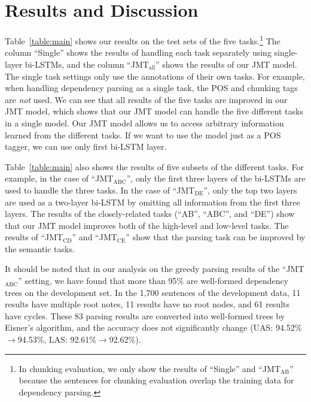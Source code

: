 \documentclass[11pt,a4paper]{article}
\begin{document}
\section{Results and Discussion}

Table~\ref{table:main} shows our results on the test sets of the five tasks.\footnote{In chunking evaluation, we only show the results of ``Single'' and ``JMT$_{\mathrm{AB}}$'' because the sentences for chunking evaluation overlap the training data for dependency parsing.}
The column ``Single'' shows the results of handling each task separately using single-layer bi-LSTMs, and the column ``JMT$_{\mathrm{all}}$'' shows the results of our JMT model.
The single task settings only use the annotations of their own tasks.
For example, when handling dependency parsing as a single task, the POS and chunking tags are {\it not} used.
We can see that all results of the five tasks are improved in our JMT model, which shows that our JMT model can handle the five different tasks in a single model.
Our JMT model allows us to access arbitrary information learned from the different tasks.
If we want to use the model just as a POS tagger, we can use only first bi-LSTM layer.

Table~\ref{table:main} also shows the results of five subsets of the different tasks.
For example, in the case of ``JMT$_{\mathrm{ABC}}$'', only the first three layers of the bi-LSTMs are used to handle the three tasks.
In the case of ``JMT$_{\mathrm{DE}}$'', only the top two layers are used as a two-layer bi-LSTM by omitting all information from the first three layers.
The results of the closely-related tasks (``AB'', ``ABC'', and ``DE'') show that our JMT model improves both of the high-level and low-level tasks.
The results of ``JMT$_{\mathrm{CD}}$'' and ``JMT$_{\mathrm{CE}}$'' show that the parsing task can be improved by the semantic tasks.

It should be noted that in our analysis on the greedy parsing results of the ``JMT$_{\mathrm{ABC}}$'' setting, we have found that more than 95\% are well-formed dependency trees on the development set.
In the 1,700 sentences of the development data, 11 results have multiple root notes, 11 results have no root nodes, and 61 results have cycles.
These 83 parsing results are converted into well-formed trees by Eisner's algorithm, and the accuracy does not significantly change (UAS: 94.52\%$\rightarrow$94.53\%, LAS: 92.61\%$\rightarrow$92.62\%).
\end{document}
